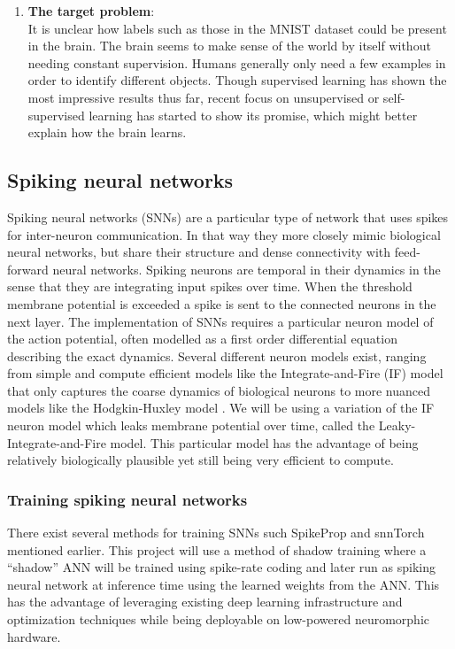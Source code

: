\documentclass[a4paper,11pt]{article}
\begin{document}
\begin{enumerate}
  \item \textbf{The target problem}: \vspace{5pt} \\
  It is unclear how labels such as those in the MNIST dataset could be present in the brain. The brain seems to make sense of the world by itself without needing constant supervision. Humans generally only need a few examples in order to identify different objects. Though supervised learning has shown the most impressive results thus far, recent focus on unsupervised or self-supervised learning has started to show its promise, which might better explain how the brain learns. 
\end{enumerate}




\newpage

\subsection{Spiking neural networks}
Spiking neural networks (SNNs) are a particular type of network that uses spikes for inter-neuron communication. In that way they more closely mimic biological neural networks, but share their structure and dense connectivity with feed-forward neural networks. Spiking neurons are temporal in their dynamics in the sense that they are integrating input spikes over time. When the threshold membrane potential is exceeded a spike is sent to the connected neurons in the next layer. The implementation of SNNs requires a particular neuron model of the action potential, often modelled as a first order differential equation describing the exact dynamics. Several different neuron models exist, ranging from simple and compute efficient models like the Integrate-and-Fire (IF) model that only captures the coarse dynamics of biological neurons to more nuanced models like the Hodgkin-Huxley model \cite{Hodgkin1952}. We will be using a variation of the IF neuron model which leaks membrane potential over time, called the Leaky-Integrate-and-Fire model. This particular model has the advantage of being relatively biologically plausible yet still being very efficient to compute. 

\subsubsection{Training spiking neural networks}
There exist several methods for training SNNs such SpikeProp \cite{Boht2000SpikePropBF} and snnTorch \cite{eshraghian2021training} mentioned earlier. This project will use a method of shadow training where a ``shadow'' ANN will be trained using spike-rate coding and later run as spiking neural network at inference time using the learned weights from the ANN. This has the advantage of leveraging existing deep learning infrastructure and optimization techniques while being deployable on low-powered neuromorphic hardware. 
\end{document}
